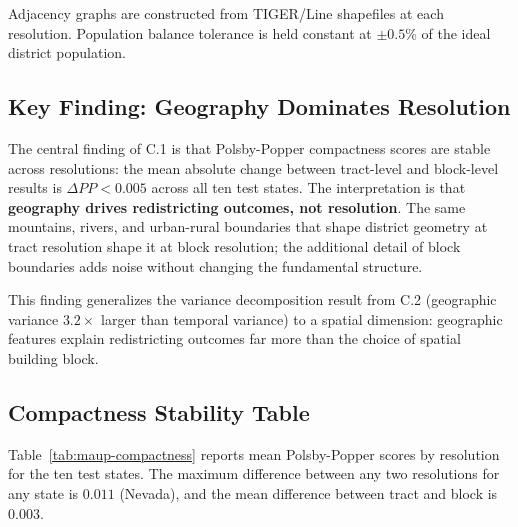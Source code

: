 Adjacency graphs are constructed from TIGER/Line shapefiles
\citep{tiger-census} at each resolution. Population balance tolerance
is held constant at $\pm 0.5\%$ of the ideal district population.

\subsection{Key Finding: Geography Dominates Resolution}

The central finding of C.1 is that Polsby-Popper compactness scores
are stable across resolutions: the mean absolute change between
tract-level and block-level results is $\Delta PP < 0.005$ across all
ten test states. The interpretation is that \textbf{geography drives
redistricting outcomes, not resolution}. The same mountains, rivers,
and urban-rural boundaries that shape district geometry at tract
resolution shape it at block resolution; the additional detail of block
boundaries adds noise without changing the fundamental structure.

This finding generalizes the variance decomposition result from C.2
(geographic variance $3.2\times$ larger than temporal variance) to a
spatial dimension: geographic features explain redistricting outcomes
far more than the choice of spatial building block.

\subsection{Compactness Stability Table}

Table~\ref{tab:maup-compactness} reports mean Polsby-Popper scores by
resolution for the ten test states. The maximum difference between any
two resolutions for any state is $0.011$ (Nevada), and the mean
difference between tract and block is $0.003$.

